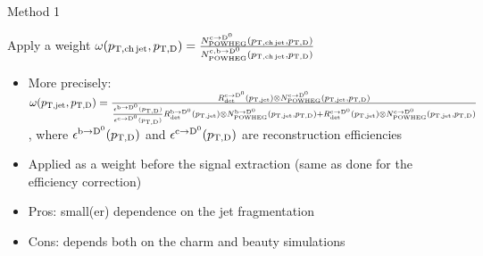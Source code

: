 \documentclass[xcolor={usenames,dvipsnames}]{beamer}
\begin{document}
\begin{frame}{Method 1}
\begin{center}
Apply a weight $\omega(p_{\mathrm{T,ch\, jet}},p_{\mathrm{T,D}})=\frac{N^{\rm c\rightarrow\mathrm{D^{0}}}_{\rm POWHEG}(p_{\mathrm{T,ch\, jet}},p_{\mathrm{T,D}})}{N^{\rm c,b\rightarrow\mathrm{D^{0}}}_{\rm POWHEG}(p_{\mathrm{T,ch\, jet}},p_{\mathrm{T,D}})}$
\end{center}
\begin{itemize}
\item More precisely: \\
$\omega(p_{\mathrm{T,jet}},p_{\mathrm{T,D}})=\frac{R_{\rm det}^{\rm c\rightarrow\mathrm{D^{0}}}(p_{\mathrm{T,jet}}) \otimes N^{\rm c\rightarrow\mathrm{D^{0}}}_{\rm POWHEG}(p_{\mathrm{T,jet}},p_{\mathrm{T,D}})}
{\frac{\epsilon^{\rm b\rightarrow\mathrm{D^{0}}}(p_{\mathrm{T,D}})}{\epsilon^{\rm c\rightarrow\mathrm{D^{0}}}(p_{\mathrm{T,D}})} R_{\rm det}^{\rm b\rightarrow\mathrm{D^{0}}}(p_{\mathrm{T,jet}}) \otimes N^{\rm b\rightarrow\mathrm{D^{0}}}_{\rm POWHEG}(p_{\mathrm{T,jet}},p_{\mathrm{T,D}}) + 
R_{\rm det}^{\rm c\rightarrow\mathrm{D^{0}}}(p_{\mathrm{T,jet}}) \otimes N^{\rm c\rightarrow\mathrm{D^{0}}}_{\rm POWHEG}(p_{\mathrm{T,jet}},p_{\mathrm{T,D}})}$,
where $\epsilon^{\rm b\rightarrow\mathrm{D^{0}}}(p_{\mathrm{T,D}})$ and $\epsilon^{\rm c\rightarrow\mathrm{D^{0}}}(p_{\mathrm{T,D}})$ are reconstruction efficiencies
\item Applied as a weight before the signal extraction (same as done for the efficiency correction)
\item Pros: small(er) dependence on the jet fragmentation
\item Cons: depends both on the charm and beauty simulations
\end{itemize}
\end{frame}
\end{document}
